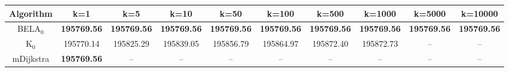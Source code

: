 \begin{tabular}{c|ccccccccc}\toprule
Algorithm & k=1 & k=5 & k=10 & k=50 & k=100 & k=500 & k=1000 & k=5000 & k=10000 \\ \midrule
BELA$_0$ & \textbf{195769.56} & \textbf{195769.56} & \textbf{195769.56} & \textbf{195769.56} & \textbf{195769.56} & \textbf{195769.56} & \textbf{195769.56} & \textbf{195769.56} & \textbf{195769.56} \\
K$_0$ & 195770.14 & 195825.29 & 195839.05 & 195856.79 & 195864.97 & 195872.40 & 195872.73 & -- & -- \\
mDijkstra & \textbf{195769.56} & -- & -- & -- & -- & -- & -- & -- & -- \\ \bottomrule 
\end{tabular}
